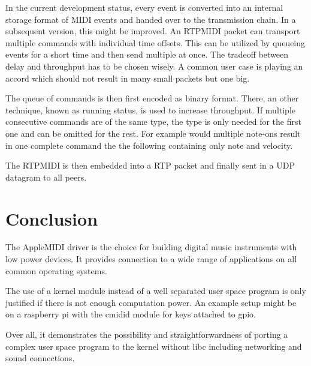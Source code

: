 \documentclass[paper=a4,fontsize=11pt,twocolumn,pagesize,bibtotoc]{scrartcl}
\begin{document}
	In the current development status, every event is converted into an internal storage format of MIDI events and handed over to the transmission chain. In a subsequent version, this might be improved. An RTPMIDI packet can transport multiple commands with individual time offsets. This can be utilized by queueing events for a short time and then send multiple at once. The tradeoff between delay and throughput has to be chosen wisely. A common user case is playing an accord which should not result in many small packets but one big.
	
	The queue of commands is then first encoded as binary format. There, an other technique, known as running status, is used to increase throughput. If multiple consecutive commands are of the same type, the type is only needed for the first one and can be omitted for the rest. For example would multiple note-ons result in one complete command the the following containing only note and velocity.
	
	The RTPMIDI is then embedded into a RTP packet and finally sent in a UDP datagram to all peers.
	
	
	\section{Conclusion}
	
	The AppleMIDI driver is the choice for building digital music instruments with low power devices. It provides connection to a wide range of applications on all common operating systems.
	
	The use of a kernel module instead of a well separated user space program is only justified if there is not enough computation power. An example setup might be on a raspberry pi with the cmidid module for keys attached to gpio.
	
	Over all, it demonstrates the possibility and straightforwardness of porting a complex user space program to the kernel without libc including networking and sound connections.
	 
	
	
	
\end{document}
